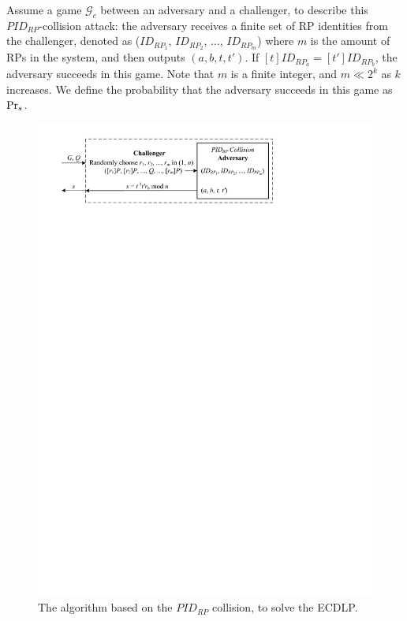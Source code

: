 Assume a game $\mathcal{G}_c$ between an adversary and a challenger,
    to describe this $PID_{RP}$-collision attack:
the adversary receives a finite set of RP identities from the challenger,
 denoted as ($ID_{RP_1}$, $ID_{RP_2}$, ..., $ID_{RP_m}$)
 where $m$ is the amount of RPs in the system,
  and then outputs $(a, b, t, t')$.
If $[t]ID_{RP_a}=[t']ID_{RP_b}$, the adversary succeeds in this game.
Note that $m$ is a finite integer, and $m \ll 2^k$ as $k$ increases.
We define the probability that the adversary succeeds in this game as ${\rm Pr}_s$.


\begin{figure}[tb]
  \centering
  \includegraphics[width=0.96\linewidth]{fig/ecdlp_algorithm.pdf}
  \caption{The algorithm based on the $PID_{RP}$ collision, to solve the ECDLP.}
  \label{fig:ecdlp_algorithm}
\end{figure}



